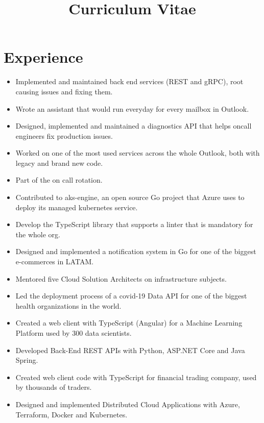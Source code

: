 \documentclass[10pt, a4paper, roman]{moderncv} %
\title{Curriculum Vitae}
\begin{document}
\makecvtitle %

\section{Experience}

{
    \begin{itemize}
        \item Implemented and maintained back end services (REST and gRPC), root causing issues and fixing them.
        \item Wrote an assistant that would run everyday for every mailbox in Outlook.
        \item Designed, implemented and maintained a diagnostics API that helps oncall engineers fix production issues.
        \item Worked on one of the most used services across the whole Outlook, both with legacy and brand new code.
        \item Part of the on call rotation.
    \end{itemize}
}

{
    \begin{itemize}
	    \item Contributed to aks-engine, an open source Go project that Azure uses to deploy its managed kubernetes service. 
	    \item Develop the TypeScript library that supports a linter that is mandatory for the whole org.
        \item Designed and implemented a notification system in Go for one of the biggest e-commerces in LATAM.
        \item Mentored five Cloud Solution Architects on infrastructure subjects.
        \item Led the deployment process of a covid-19 Data API for one of the biggest health organizations in the world.
    \end{itemize}
}

{
    \begin{itemize}
        \item Created a web client with TypeScript (Angular) for a Machine Learning Platform used by 300 data scientists.
        \item Developed Back-End REST APIs with Python, ASP.NET Core and Java Spring.
        \item Created web client code with TypeScript for financial trading company, used by thousands of traders. 
	    \item Designed and implemented Distributed Cloud Applications with Azure, Terraform, Docker and Kubernetes.
    \end{itemize}
}
\end{document}
